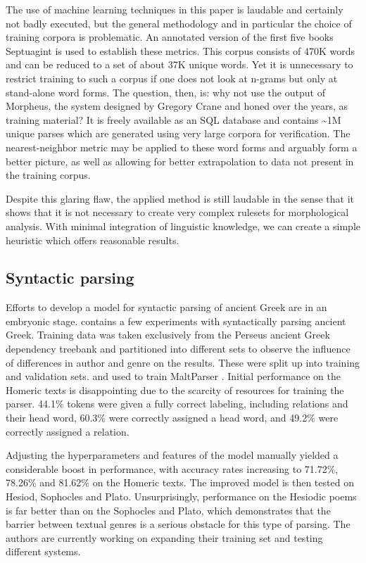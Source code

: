 The use of machine learning techniques in this paper is laudable and
certainly not badly executed, but the general methodology and in
particular the choice of training corpora is problematic. An annotated
version of the first five books Septuagint is used to establish these
metrics. This corpus consists of 470K words and can be reduced to a
set of about 37K unique words. Yet it is unnecessary to restrict
training to such a corpus if one does not look at n-grams but only at
stand-alone word forms. The question, then, is: why not use the output
of Morpheus, the system designed by Gregory Crane and honed over the
years, as training material? It is freely available as an SQL database
and contains \textasciitilde1M unique parses which are generated using very large
corpora for verification. The nearest-neighbor metric may be applied
to these word forms and arguably form a better picture, as well as
allowing for better extrapolation to data not present in the training
corpus.

Despite this glaring flaw, the applied method is still laudable in the
sense that it shows that it is not necessary to create very complex
rulesets for morphological analysis. With minimal integration of
linguistic knowledge, we can create a simple heuristic which offers
reasonable results.

\subsection{Syntactic parsing}
Efforts to develop a model for syntactic parsing of ancient Greek are
in an embryonic stage. \cite{mambrini2012} contains a few experiments
with syntactically parsing ancient Greek. Training data was taken
exclusively from the Perseus ancient Greek dependency treebank and
partitioned into different sets to observe the influence of
differences in author and genre on the results. These were split up
into training and validation sets. and used to train MaltParser
\citep{nivre2006maltparser}. Initial performance on the Homeric texts
is disappointing due to the scarcity of resources for training the
parser. 44.1\% tokens were given a fully correct labeling, including
relations and their head word, 60.3\% were correctly assigned a head
word, and 49.2\% were correctly assigned a relation.

Adjusting the hyperparameters and features of the model manually
yielded a considerable boost in performance, with accuracy rates
increasing to 71.72\%, 78.26\% and 81.62\% on the Homeric texts. The
improved model is then tested on Hesiod, Sophocles and
Plato. Unsurprisingly, performance on the Hesiodic poems is far better
than on the Sophocles and Plato, which demonstrates that the barrier
between textual genres is a serious obstacle for this type of
parsing. The authors are currently working on expanding their training
set and testing different systems.

